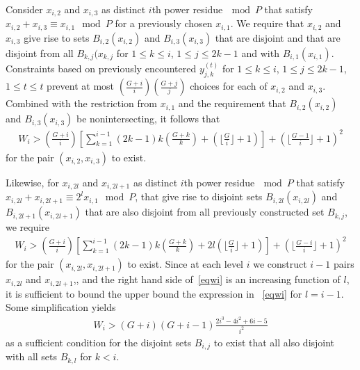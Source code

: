 Consider $x_{i,2}$ and $x_{i,3}$ as distinct $i$th power
residue$~\mod P$ that satisfy $x_{i,2}+ x_{i,3} \equiv x_{i,1}
\mod P$ for a previously chosen $x_{i,1}$. We require that
 $x_{i,2}$ and $x_{i,3}$ give rise to sets $B_{i,2}(x_{i,2})$ and
$B_{i,3}(x_{i,3})$ that are disjoint and that are disjoint from
all $B_{k,j}(x_{k,j}$ for $1\leq k \leq i$, $1\leq j \leq 2k-1$
and with $B_{i,1}(x_{i,1})$. Constraints based on previously
encountered $y_{j,k}^{(t)}$ for $1\leq k \leq i$, $1\leq j \leq
2k-1$, $1 \leq t \leq t$ prevent at most
$(\frac{G+i}{i})(\frac{G+j}{j})$ choices for each of $x_{i,2}$ and
$x_{i,3}$. Combined with the restriction from $x_{i,1}$ and the
requirement that $B_{i,2}(x_{i,2})$ and $B_{i,3}(x_{i,3})$ be
nonintersecting, it follows that
\begin{equation}\begin{array}{lll} W_i>
(\frac{G+i}{i}) \left[\sum_{k=1}^{i-1}
(2k-1)k(\frac{G+k}{k})+\left( \lfloor
\frac{G}{i}\rfloor+1\right)\right]+\left( \lfloor
\frac{G-1}{i}\rfloor+1\right)^2
\end{array}\end{equation}
for the pair $(x_{i,2},x_{i,3})$ to exist.

Likewise, for  $x_{i,2l}$ and $x_{i,2l+1}$ as distinct $i$th power
residue$~\mod P$ that satisfy $x_{i,2l}+ x_{i,2l+1} \equiv
2^lx_{i,1} \mod P$, that give rise to disjoint sets
$B_{i,2l}(x_{i,2l})$ and $B_{i,2l+1}(x_{i,2l+1})$ that are also
disjoint from all previously constructed set $B_{k,j}$, we require
\begin{equation}\label{eqwi}\begin{array}{lll} W_i>
(\frac{G+i}{i}) \left[\sum_{k=1}^{i-1}
(2k-1)k(\frac{G+k}{k})+2l\left( \lfloor
\frac{G}{i}\rfloor+1\right)\right]+\left( \lfloor
\frac{G-i}{i}\rfloor+1\right)^2
\end{array}\end{equation}
for the pair $(x_{i,2l},x_{i,2l+1})$ to exist. Since at each level
$i$ we construct $i-1$ pairs $x_{i,2l}$ and $x_{i,2l+1}$,, and the
right hand side of~\eqref{eqwi} is an increasing function of $l$,
it is sufficient to bound the upper bound the expression in
~\eqref{eqwi} for $l=i-1$. Some simplification yields
\begin{equation}\begin{array}{lll} W_i>
(G+i)(G+i-1)\frac{2i^3-4i^2+6i-5}{i^2}
\end{array}\end{equation}
as a sufficient condition for the disjoint sets $B_{i,j}$ to exist
that all also disjoint with all sets $B_{k,l}$ for $k<i$.

